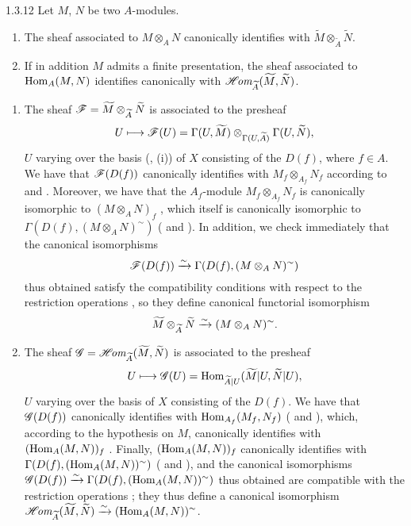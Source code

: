 \begin{envs}[Corollary]{1.3.12}
\label{cor-1.1.3.12}
Let $M$, $N$ be two $A$-modules.
\begin{enumerate}[label=\rm{(\roman*)}]
  \item The sheaf associated to $M\otimes_A N$ canonically identifies with
        $\widetilde{M}\otimes_{\widetilde{A}}\widetilde{N}$.
  \item If in addition $M$ admits a finite presentation, the sheaf associated to
        ${\mathop{\mathrm{Hom}}\nolimits}_A(M,N)$ identifies canonically with
        $\mathscr{H}\!\textit{om}_{\widetilde{A}}(\widetilde{M},\widetilde{N})$.
\end{enumerate}
\end{envs}
\begin{enumerate}[label=(\roman*)]
  \item The sheaf $\mathscr{F}=\widetilde{M}\otimes_{\widetilde{A}}\widetilde{N}$ is associated to
        the presheaf
        \[
          U\longmapsto\mathscr{F}(U)
          =\Gamma(U,\widetilde{M})\otimes_{\Gamma(U,\widetilde{A})}\Gamma(U,\widetilde{N}),
        \]
        $U$ varying over the basis (, (i)) of $X$ consisting of the
        $D(f)$, where $f\in A$. We have that $\mathscr{F}(D(f))$ canonically identifies with
        $M_f\otimes_{A_f}N_f$ according to  and .
        Moreover, we have that the $A_f$-module $M_f\otimes_{A_f}N_f$ is canonically
        isomorphic to $(M\otimes_A N)_f$ , which itself is canonically
        isomorphic to $\Gamma(D(f),(M\otimes_A N)^\sim)$ ( and
        ). In addition, we check immediately that the canonical
        isomorphisms
        \[
          \mathscr{F}(D(f))\xrightarrow{\sim}\Gamma(D(f),(M\otimes_A N)^\sim)
        \]
        thus obtained satisfy the compatibility conditions with respect to the restriction
        operations , so they define canonical functorial isomorphism
        \[
          \widetilde{M}\otimes_{\widetilde{A}}\widetilde{N}\xrightarrow{\sim}(M\otimes_A N)^\sim.
        \]
  \item The sheaf $\mathscr{G}=\mathscr{H}\!\textit{om}_{\widetilde{A}}(\widetilde{M},\widetilde{N})$ is associated
        to the presheaf
        \[
          U\longmapsto\mathscr{G}(U)={\mathop{\mathrm{Hom}}\nolimits}_{\widetilde{A}|U}(\widetilde{M}|U,\widetilde{N}|U),
        \]
        $U$ varying over the basis of $X$ consisting of the $D(f)$. We have that
        $\mathscr{G}(D(f))$ canonically identifies with ${\mathop{\mathrm{Hom}}\nolimits}_{A_f}(M_f,N_f)$ (
        and ), which, according to the hypothesis on $M$, canonically
        identifies with $({\mathop{\mathrm{Hom}}\nolimits}_A(M,N))_f$ . Finally, $({\mathop{\mathrm{Hom}}\nolimits}_A(M,N))_f$
        canonically identifies with $\Gamma(D(f),({\mathop{\mathrm{Hom}}\nolimits}_A(M,N))^\sim)$ ( and
        ), and the canonical isomorphisms
        $\mathscr{G}(D(f))\xrightarrow{\sim}\Gamma(D(f),({\mathop{\mathrm{Hom}}\nolimits}_A(M,N))^\sim)$ thus obtained are compatible with
        the restriction operations ; they thus define a canonical
        isomorphism
        $\mathscr{H}\!\textit{om}_{\widetilde{A}}(\widetilde{M},\widetilde{N})\xrightarrow{\sim}({\mathop{\mathrm{Hom}}\nolimits}_A(M,N))^\sim$.
\end{enumerate}

